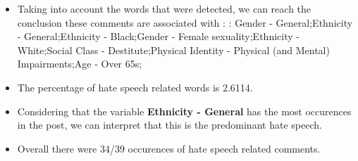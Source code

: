\documentclass[11pt]{article}
\begin{document}
\begin{itemize}\item Taking into account the words that were detected, we can reach the conclusion these comments are associated with : : Gender - General;Ethnicity - General;Ethnicity - Black;Gender - Female sexuality;Ethnicity - White;Social Class - Destitute;Physical Identity - Physical (and Mental) Impairments;Age - Over 65s;%

\item The percentage of hate speech related words is 2.6114.

\item Considering that the variable \textbf{Ethnicity - General} has the most occurences in the post, we can interpret that this is the predominant hate speech.

\item Overall there were 34/39 occurences of hate speech related comments.\end{itemize}
\end{document}
